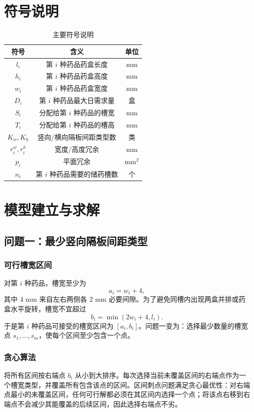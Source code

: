 \documentclass[UTF8,a4paper,12pt]{ctexart}
\begin{document}
\section{符号说明}
\begin{table}[H]\centering\caption{主要符号说明}\begin{tabular}{ccc}\toprule
符号 & 含义 & 单位\\\midrule
$l_i$ & 第 $i$ 种药品药盒长度 & mm\\
$h_i$ & 第 $i$ 种药品药盒高度 & mm\\
$w_i$ & 第 $i$ 种药品药盒宽度 & mm\\
$D_i$ & 第 $i$ 种药品最大日需求量 & 盒\\
$S_i$ & 分配给第 $i$ 种药品的槽宽 & mm\\
$T_i$ & 分配给第 $i$ 种药品的槽高 & mm\\
$K_w,K_h$ & 竖向/横向隔板间距类型数 & 类\\
$r_i^w,r_i^h$ & 宽度/高度冗余 & mm\\
$p_i$ & 平面冗余 & mm$^2$\\
$n_i$ & 第 $i$ 种药品需要的储药槽数 & 个\\\bottomrule\end{tabular}\end{table}

\section{模型建立与求解}
\subsection{问题一：最少竖向隔板间距类型}
\subsubsection{可行槽宽区间}
对第 $i$ 种药品，槽宽至少为
\begin{equation}
a_i=w_i+4,
\end{equation}
其中 4 mm 来自左右两侧各 2 mm 必要间隙。为了避免同槽内出现两盒并排或药盒水平旋转，槽宽不宜超过
\begin{equation}
b_i=\min(2w_i+4,l_i).
\end{equation}
于是第 $i$ 种药品可接受的槽宽区间为 $[a_i,b_i]$。问题一变为：选择最少数量的槽宽点 $s_1,\ldots,s_m$，使每个区间至少包含一个点。

\subsubsection{贪心算法}
将所有区间按右端点 $b_i$ 从小到大排序。每次选择当前未覆盖区间的右端点作为一个槽宽类型，并覆盖所有包含该点的区间。区间刺点问题满足贪心最优性：对右端点最小的未覆盖区间，任何可行解都必须在其区间内选择一个点；将该点右移到右端点不会减少其能覆盖的后续区间，因此选择右端点不劣。
\end{document}
